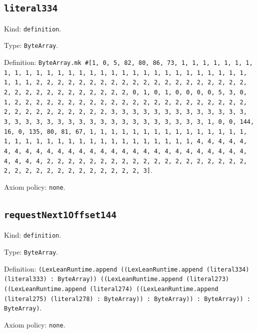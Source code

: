 \documentclass[11pt]{article}
\begin{document}
\subsection*{\texttt{literal334}}
\noindent Kind: \texttt{definition}.\par
\noindent Type: \texttt{ByteArray}.\par
\noindent Definition: \texttt{ByteArray.mk \#[1, 0, 5, 82, 80, 86, 73, 1, 1, 1, 1, 1, 1, 1, 1, 1, 1, 1, 1, 1, 1, 1, 1, 1, 1, 1, 1, 1, 1, 1, 1, 1, 1, 1, 1, 1, 1, 1, 1, 1, 2, 2, 2, 2, 2, 2, 2, 2, 2, 2, 2, 2, 2, 2, 2, 2, 2, 2, 2, 2, 2, 2, 2, 2, 2, 2, 2, 2, 2, 2, 2, 2, 0, 1, 0, 1, 0, 0, 0, 0, 5, 3, 0, 1, 2, 2, 2, 2, 2, 2, 2, 2, 2, 2, 2, 2, 2, 2, 2, 2, 2, 2, 2, 2, 2, 2, 2, 2, 2, 2, 2, 2, 2, 2, 2, 2, 3, 3, 3, 3, 3, 3, 3, 3, 3, 3, 3, 3, 3, 3, 3, 3, 3, 3, 3, 3, 3, 3, 3, 3, 3, 3, 3, 3, 3, 3, 3, 3, 1, 0, 0, 144, 16, 0, 135, 80, 81, 67, 1, 1, 1, 1, 1, 1, 1, 1, 1, 1, 1, 1, 1, 1, 1, 1, 1, 1, 1, 1, 1, 1, 1, 1, 1, 1, 1, 1, 1, 1, 1, 1, 1, 4, 4, 4, 4, 4, 4, 4, 4, 4, 4, 4, 4, 4, 4, 4, 4, 4, 4, 4, 4, 4, 4, 4, 4, 4, 4, 4, 4, 4, 4, 4, 4, 2, 2, 2, 2, 2, 2, 2, 2, 2, 2, 2, 2, 2, 2, 2, 2, 2, 2, 2, 2, 2, 2, 2, 2, 2, 2, 2, 2, 2, 2, 2, 2, 3]}.\par
\noindent Axiom policy: \texttt{none}.\par
\subsection*{\texttt{requestNext1Offset144}}
\noindent Kind: \texttt{definition}.\par
\noindent Type: \texttt{ByteArray}.\par
\noindent Definition: \texttt{(LexLeanRuntime.append ((LexLeanRuntime.append (literal334) (literal333) : ByteArray)) ((LexLeanRuntime.append (literal273) ((LexLeanRuntime.append (literal274) ((LexLeanRuntime.append (literal275) (literal278) : ByteArray)) : ByteArray)) : ByteArray)) : ByteArray)}.\par
\noindent Axiom policy: \texttt{none}.\par
\end{document}
